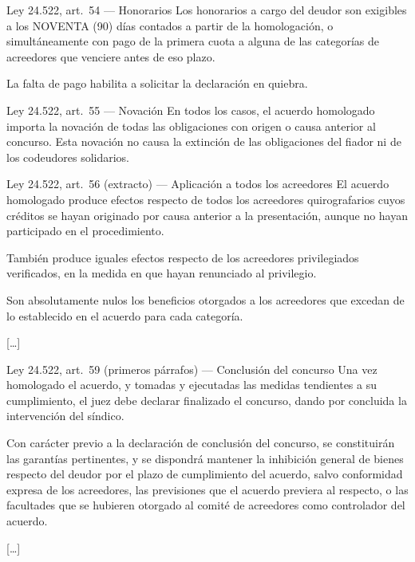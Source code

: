 \documentclass[12pt,oneside]{book}
\begin{document}
\begin{norma}{Ley 24.522, art.\ 54 --- Honorarios}
Los honorarios a cargo del deudor son exigibles a los NOVENTA (90) días contados a partir de la homologación, o simultáneamente con pago de la primera cuota a alguna de las categorías de acreedores que venciere antes de eso plazo.

La falta de pago habilita a solicitar la declaración en quiebra.
\end{norma}

\begin{norma}{Ley 24.522, art.\ 55 --- Novación}
En todos los casos, el acuerdo homologado importa la novación de todas las obligaciones con origen o causa anterior al concurso. Esta novación no causa la extinción de las obligaciones del fiador ni de los codeudores solidarios.
\end{norma}

\begin{norma}{Ley 24.522, art.\ 56 (extracto) --- Aplicación a todos los acreedores}
El acuerdo homologado produce efectos respecto de todos los acreedores quirografarios cuyos créditos se hayan originado por causa anterior a la presentación, aunque no hayan participado en el procedimiento.

También produce iguales efectos respecto de los acreedores privilegiados verificados, en la medida en que hayan renunciado al privilegio.

Son absolutamente nulos los beneficios otorgados a los acreedores que excedan de lo establecido en el acuerdo para cada categoría.

[\ldots]
\end{norma}

\begin{norma}{Ley 24.522, art.\ 59 (primeros párrafos) --- Conclusión del concurso}
Una vez homologado el acuerdo, y tomadas y ejecutadas las medidas tendientes a su cumplimiento, el juez debe declarar finalizado el concurso, dando por concluida la intervención del síndico.

Con carácter previo a la declaración de conclusión del concurso, se constituirán las garantías pertinentes, y se dispondrá mantener la inhibición general de bienes respecto del deudor por el plazo de cumplimiento del acuerdo, salvo conformidad expresa de los acreedores, las previsiones que el acuerdo previera al respecto, o las facultades que se hubieren otorgado al comité de acreedores como controlador del acuerdo.

[\ldots]
\end{norma}
\end{document}
